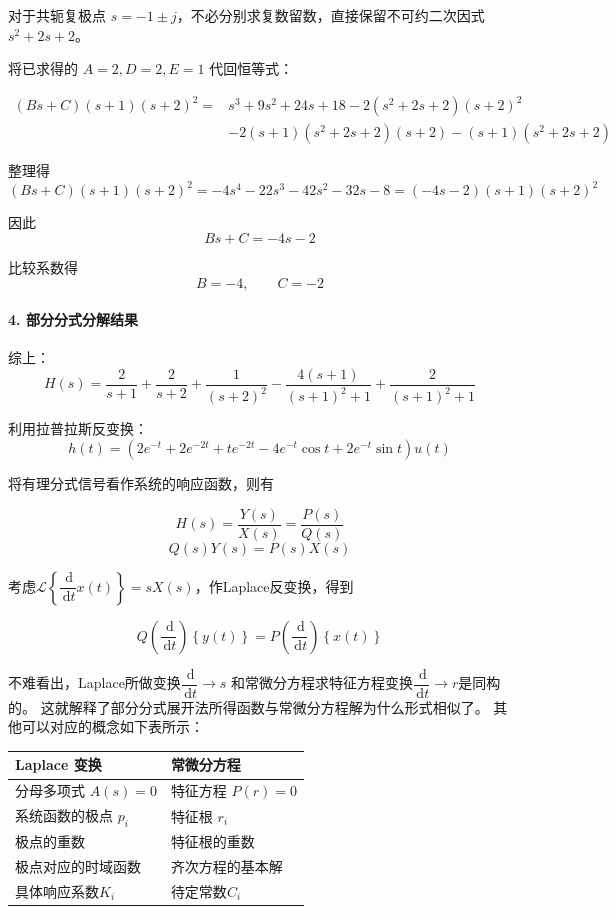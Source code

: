 \documentclass[UTF8,fontset=fandol,zihao=5]{ctexart}
\newcommand{\dd}{\,\mathrm{d}}
\newcommand{\LL}{\mathcal{L}}
\begin{document}
\begin{methodbox}[【技巧】Laplace反变换]
  对于共轭复极点 $s=-1\pm j$，不必分别求复数留数，直接保留不可约二次因式 $s^2+2s+2$。

  将已求得的 $A=2,D=2,E=1$ 代回恒等式：

  \[
  \begin{aligned}
  (Bs+C)(s+1)(s+2)^2=&s^3+9s^2+24s+18-2(s^2+2s+2)(s+2)^2 \\
  &-2(s+1)(s^2+2s+2)(s+2)-(s+1)(s^2+2s+2)
  \end{aligned}
  \]

  整理得
  \[
  (Bs+C)(s+1)(s+2)^2=-4s^4-22s^3-42s^2-32s-8=(-4s-2)(s+1)(s+2)^2
  \]

  因此
  \[
  Bs+C=-4s-2
  \]

  比较系数得
  \[
  \boxed{B=-4,\qquad C=-2}
  \]

  \paragraph{4. 部分分式分解结果}

  综上：
  \[
  \boxed{
  H(s)=\frac{2}{s+1}
  +\frac{2}{s+2}
  +\frac{1}{(s+2)^2}-\frac{4(s+1)}{(s+1)^2+1}
  +\frac{2}{(s+1)^2+1}
  }
  \]

  利用拉普拉斯反变换：
  \[
  \boxed{
  h(t)=
  (2e^{-t}+2e^{-2t}+te^{-2t}-4e^{-t}\cos t+2e^{-t}\sin t)u(t)
  }
  \]
\end{methodbox}

\begin{methodbox}[【理解】复常微分方程与部分分式展开法]
  将有理分式信号看作系统的响应函数，则有
  
  \[
  H(s)=\frac{Y(s)}{X(s)}=\frac{P(s)}{Q(s)}
  \]
  \[
  Q(s)Y(s)=P(s)X(s)
  \]

  考虑$\LL\left\{\dfrac{\dd}{\dd t}x(t)\right\}=sX(s)$，作Laplace反变换，得到
  
  \[
  Q\left(\frac{\dd}{\dd t}\right)\left\{y(t)\right\}=P\left(\frac{\dd}{\dd t}\right)\left\{x(t)\right\}
  \]

  不难看出，Laplace所做变换$\dfrac{\dd}{\dd t} \longrightarrow s$
  和常微分方程求特征方程变换$\dfrac{\dd}{\dd t}\longrightarrow r$是同构的。
  这就解释了部分分式展开法所得函数与常微分方程解为什么形式相似了。
  其他可以对应的概念如下表所示：

  \begin{center}
    \centering
    \begin{tabularx}{\textwidth}{
    @{}
    >{\centering\arraybackslash}X
    >{\centering\arraybackslash}X@{}
    }
      \toprule
      Laplace 变换 & 常微分方程 \\
      \midrule
      分母多项式 $A(s)=0$ & 特征方程 $P(r)=0$ \\
      系统函数的极点 $p_i$ & 特征根 $r_i$ \\
      极点的重数 & 特征根的重数 \\
      极点对应的时域函数 & 齐次方程的基本解 \\
      具体响应系数$K_i$ & 待定常数$C_i$ \\
      \bottomrule
    \end{tabularx}
  \end{center}
\end{methodbox}
\end{document}
